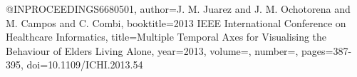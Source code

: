 @INPROCEEDINGS{6680501,
  author={J. M. {Juarez} and J. M. {Ochotorena} and M. {Campos} and C. {Combi}},
  booktitle={2013 IEEE International Conference on Healthcare Informatics}, 
  title={Multiple Temporal Axes for Visualising the Behaviour of Elders Living Alone}, 
  year={2013},
  volume={},
  number={},
  pages={387-395},
  doi={10.1109/ICHI.2013.54}}